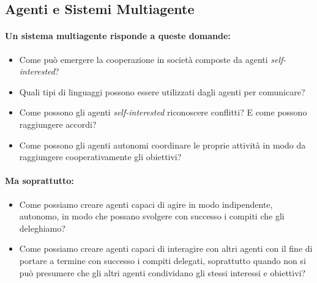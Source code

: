 \subsection{Agenti e Sistemi Multiagente}




\paragraph{Un sistema multiagente risponde a queste domande:}

\begin{itemize}
  \item Come può emergere la cooperazione in società composte da agenti \textit{self-interested}?
  \item Quali tipi di linguaggi possono essere utilizzati dagli agenti per comunicare?
  \item Come possono gli agenti \textit{self-interested} riconoscere conflitti? E come possono raggiungere accordi?
  \item Come possono gli agenti autonomi coordinare le proprie attività in modo da raggiungere cooperativamente gli obiettivi?
\end{itemize}

\paragraph{Ma soprattutto:}

\begin{itemize}
  \item Come possiamo creare agenti capaci di agire in modo indipendente, autonomo, in modo che possano svolgere con successo i compiti che gli deleghiamo?
  \item Come possiamo creare agenti capaci di interagire con altri agenti con il fine di portare a termine con successo i compiti delegati, soprattutto quando non si può presumere che gli altri agenti condividano gli stessi interessi e obiettivi?
\end{itemize}

